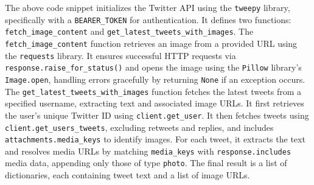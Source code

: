 \noindent 
The above code snippet initializes the Twitter API using the \texttt{tweepy} library, specifically with a \texttt{BEARER\_TOKEN} for authentication. It defines two functions: \texttt{fetch\_image\_content} and \texttt{get\_latest\_tweets\_with\_images}. The \texttt{fetch\_image\_content} function retrieves an image from a provided URL using the \texttt{requests} library. It ensures successful HTTP requests via \texttt{response.raise\_for\_status()} and opens the image using the \texttt{Pillow} library's \texttt{Image.open}, handling errors gracefully by returning \texttt{None} if an exception occurs. The \texttt{get\_latest\_tweets\_with\_images} function fetches the latest tweets from a specified username, extracting text and associated image URLs. It first retrieves the user's unique Twitter ID using \texttt{client.get\_user}. It then fetches tweets using \texttt{client.get\_users\_tweets}, excluding retweets and replies, and includes \texttt{attachments.media\_keys} to identify images. For each tweet, it extracts the text and resolves media URLs by matching \texttt{media\_keys} with \texttt{response.includes} media data, appending only those of type \texttt{photo}. The final result is a list of dictionaries, each containing tweet text and a list of image URLs.














